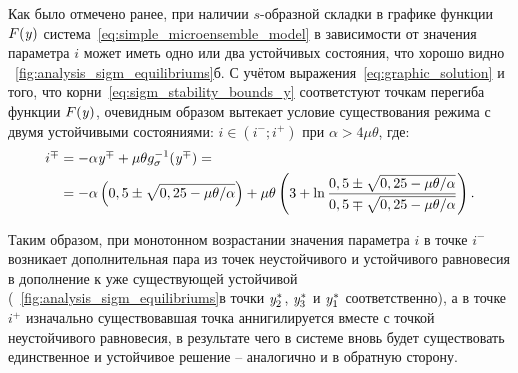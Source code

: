 Как было отмечено ранее, при наличии $s$-образной складки в графике функции $F(\mathit{y})$ система~\eqref{eq:simple_microensemble_model} в зависимости от значения параметра $i$ может иметь одно или два устойчивых состояния, что хорошо видно \onfigure~\ref{fig:analysis_sigm_equilibriums}б. С учётом выражения~\eqref{eq:graphic_solution} и того, что корни~\eqref{eq:sigm_stability_bounds_y} соответстуют точкам перегиба функции $F(\mathit{y})$, очевидным образом вытекает условие существования режима с двумя устойчивыми состояниями: $i \in \left(i^{-}; i^{+}\right)$ при $\alpha > 4 \mu \theta$, где:
\begin{equation}
    \label{eq:sigm_stability_bounds_i}
    \begin{alignedat}{2}
        i^{\mp} &= -\alpha \mathit{y}^{\mp} + \mu \theta g_{\sigma}^{-1}(\mathit{y}^{\mp}) = \\
                &= -\alpha \left(0,5 \pm \sqrt{0,25 - \mu \theta / \alpha}\right) + \mu \theta \left(3 + \ln\dfrac{0,5 \pm \sqrt{0,25 - \mu \theta / \alpha}}{0,5 \mp \sqrt{0,25 - \mu \theta / \alpha}}\right).
    \end{alignedat}
\end{equation}

Таким образом, при монотонном возрастании значения параметра $i$ в точке $i^{-}$ возникает дополнительная пара из точек неустойчивого и устойчивого равновесия в дополнение к уже существующей устойчивой (\onfigure~\ref{fig:analysis_sigm_equilibriums}в точки $\mathit{y}^{*}_{2}$, $\mathit{y}^{*}_{3}$ и $\mathit{y}^{*}_{1}$ соответственно), а в точке $i^{+}$ изначально существовавшая точка аннигилируется вместе с точкой неустойчивого равновесия, в результате чего в системе вновь будет существовать единственное и устойчивое решение -- аналогично и в обратную сторону.

